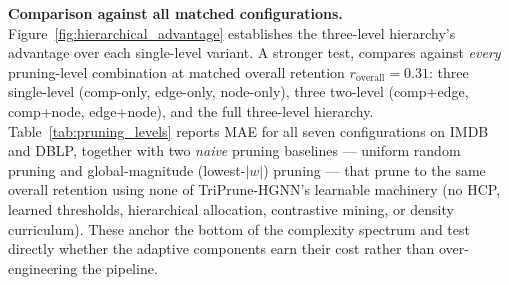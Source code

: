 \documentclass[10pt]{article}
\theoremstyle{plain}
\theoremstyle{definition}
\begin{document}
\textbf{Comparison against all matched configurations.} Figure~\ref{fig:hierarchical_advantage} establishes the three-level hierarchy's advantage over each single-level variant. A stronger test, compares against \emph{every} pruning-level combination at matched overall retention $r_{\mathrm{overall}}\!=\!0.31$: three single-level (comp-only, edge-only, node-only), three two-level (comp+edge, comp+node, edge+node), and the full three-level hierarchy. Table~\ref{tab:pruning_levels} reports MAE for all seven configurations on IMDB and DBLP, together with two \emph{naive} pruning baselines --- uniform random pruning and global-magnitude (lowest-$|w|$) pruning --- that prune to the same overall retention using none of TriPrune-HGNN's learnable machinery (no HCP, learned thresholds, hierarchical allocation, contrastive mining, or density curriculum). These anchor the bottom of the complexity spectrum and test directly whether the adaptive components earn their cost rather than over-engineering the pipeline.
 
\end{document}
